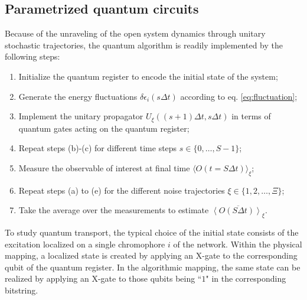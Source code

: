 \documentclass[12pt, amsmath, amssymb, graphicx]{iopart}
\begin{document}
\subsection{\label{subsec:Parametrized quantum circuits}Parametrized quantum circuits}

Because of the unraveling of the open system dynamics through unitary stochastic trajectories, the quantum algorithm is readily implemented by the following steps: 
%
\begin{enumerate}[label=(\alph*)]
    \item Initialize the quantum register to encode the initial state of the system; 
    \item Generate the energy fluctuations $\delta \epsilon_{i}(s \Delta t)$ according to eq. \ref{eq:fluctuation};
    \item Implement the unitary propagator $U_{\xi}((s+1) \Delta t, s \Delta t)$ in terms of quantum gates acting on the quantum register;
    \item Repeat steps (b)-(c) for different time steps $s \in \{0, \dots, S-1 \}$;
    \item Measure the observable of interest at final time $\langle O(t = S \Delta t) \rangle_\xi$;
    \item Repeat steps (a) to (e) for the different noise trajectories $\xi \in \{ 1, 2, \dots, \Xi \}$;
    \item Take the average over the measurements to estimate $\overline{\left\langle O(S\Delta t) \right\rangle_\xi}$.
\end{enumerate}

To study quantum transport, the typical choice of the initial state consists of the excitation localized on a single chromophore $i$ of the network. Within the physical mapping, a localized state is created by applying an X-gate to the corresponding qubit of the quantum register. In the algorithmic mapping, the same state can be realized by applying an X-gate to those qubits being ``$1$" in the corresponding bitstring.
\end{document}

